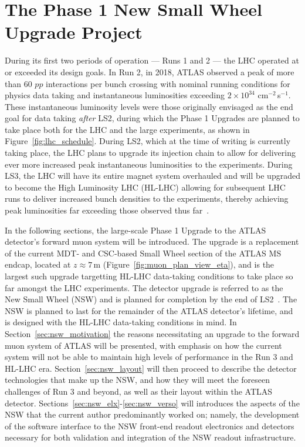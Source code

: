 \chapter{The Phase 1 New Small Wheel Upgrade Project}
\label{chap:nsw}

During its first two periods of operation --- Runs 1 and 2 --- the LHC operated
at or exceeded its design goals.
In Run 2, in 2018, ATLAS observed a peak of more than 60 $pp$ interactions per bunch crossing with nominal running conditions for physics data taking
and instantaneous luminosities exceeding $2\times 10^{34}$ cm$^{-2}$\,s$^{-1}$.
These instantaneous luminosity levels were those originally envisaged as the end goal for data taking \textit{after} LS2,
during which the Phase 1 Upgrades are planned to take place both for the LHC and the large experiments, as shown in Figure~\ref{fig:lhc_schedule}.
During LS2, which at the time of writing is currently taking place, the LHC plans to upgrade its injection chain to allow for delivering ever
more increased peak instantaneous luminosities to the experiments.
During LS3, the LHC will have its entire magnet system overhauled and will be upgraded to become the
High Luminosity LHC (HL-LHC) allowing for subsequent LHC runs to deliver increased bunch densities 
to the experiments, thereby achieving peak luminosities far exceeding those observed thus far~\cite{HLLHCPDR}.

In the following sections, the large-scale Phase 1 Upgrade to the ATLAS detector's forward muon system
will be introduced.
The upgrade is a replacement of the current MDT- and CSC-based Small Wheel section of the ATLAS MS endcap, located at $z \approx 7$\,m (Figure~\ref{fig:muon_plan_view_eta}),
and is the largest such upgrade targetting HL-LHC data-taking conditions to take place so far amongst the LHC experiments.
The detector upgrade is referred to as the New Small Wheel (NSW) and is planned for completion by
the end of LS2~\cite{NSWTDR}.
The NSW is planned to last for the remainder of the ATLAS detector's lifetime, and is designed with the
HL-LHC data-taking conditions in mind.
In Section~\ref{sec:nsw_motivation} the reasons necessitating an upgrade to the forward muon system
of ATLAS will be presented, with emphasis on how the current system will not be able to maintain high
levels of performance in the Run 3 and HL-LHC era.
Section~\ref{sec:nsw_layout} will then proceed to describe the detector technologies that make up
the NSW, and how they will meet the foreseen challenges of Run 3 and beyond, as well as their layout
within the ATLAS detector.
Sections~\ref{sec:nsw_elx}-\ref{sec:nsw_verso} will introduces the aspects of the NSW that the
current author predominantly worked on; namely, the development of the software interface to the NSW front-end readout
electronics and detectors necessary for both validation and integration of the NSW readout infrastructure.

